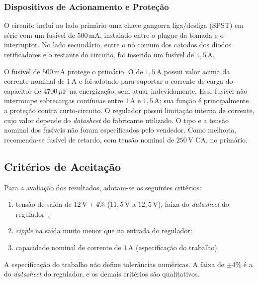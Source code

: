 \subsubsection{Dispositivos de Acionamento e Proteção}
O circuito inclui no lado primário uma chave gangorra liga/desliga (SPST) em série com um fusível de $500\,\text{mA}$, instalado entre o plugue da tomada e o interruptor. No lado secundário, entre o nó comum dos catodos dos diodos retificadores e o restante do circuito, foi inserido um fusível de $1{,}5\,\text{A}$.

O fusível de $500\,\text{mA}$ protege o primário. O de $1{,}5\,\text{A}$ possui valor acima da corrente nominal de $1\,\text{A}$ e foi adotado para suportar a corrente de carga do capacitor de $4700\,\mu\text{F}$ na energização, sem atuar indevidamente. Esse fusível não interrompe sobrecargas contínuas entre $1\,\text{A}$ e $1{,}5\,\text{A}$; sua função é principalmente a proteção contra curto-circuito. O regulador possui limitação interna de corrente, cujo valor depende do \textit{datasheet} do fabricante utilizado. O tipo e a tensão nominal dos fusíveis não foram especificados pelo vendedor. Como melhoria, recomenda-se fusível de retardo, com tensão nominal de $250\,\text{V}$ CA, no primário.

\subsection{Critérios de Aceitação}

Para a avaliação dos resultados, adotam-se os seguintes critérios:
\begin{enumerate}
    \item tensão de saída de $12\,\text{V} \pm 4\%$ ($11{,}5\,\text{V}$ a $12{,}5\,\text{V}$), faixa do \textit{datasheet} do regulador~\cite{ds_lm7812};
    \item \textit{ripple} na saída muito menor que na entrada do regulador;
    \item capacidade nominal de corrente de $1\,\text{A}$ (especificação do trabalho).
\end{enumerate}
A especificação do trabalho não define tolerâncias numéricas. A faixa de $\pm 4\%$ é a do \textit{datasheet} do regulador, e os demais critérios são qualitativos.
